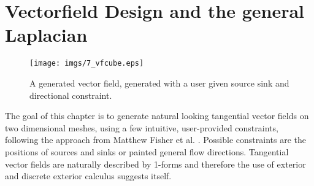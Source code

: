 \chapter{Vectorfield Design and the general Laplacian}
\label{chap:vfs}

\begin{figure}[h]%
\begin{center}\hspace{2cm}
\texttt{[image: imgs/7\_vfcube.eps]}%
\end{center}
\caption{A generated vector field, generated with a user given source sink and directional constraint.}%
\label{fig:vfCube}%
\end{figure}

	
The goal of this chapter is to generate natural looking tangential vector fields on two dimensional meshes, using a few intuitive, user-provided constraints, following the approach from Matthew Fisher et al. \cite{vField}. Possible constraints are the positions of sources and sinks or painted general flow directions. Tangential vector fields are naturally described by 1-forms and therefore the use of exterior and discrete exterior calculus suggests itself. 

